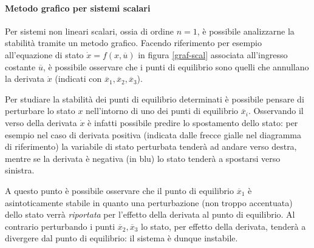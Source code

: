 		\paragraph{Metodo grafico per sistemi scalari} Per sistemi non lineari scalari, ossia di ordine $n=1$, è possibile analizzarne la stabilità tramite un metodo grafico. Facendo riferimento per esempio all'equazione di stato $\dot x = f(x,\overline u)$ in figura \ref{graf-scal} associata all'ingresso costante $\overline u$, è possibile osservare che i punti di equilibrio sono quelli che annullano la derivata $\dot x$ (indicati con $\overline x_1,\overline x_2,\overline x_3$).		
			
		
		Per studiare la stabilità dei punti di equilibrio determinati è possibile pensare di perturbare lo stato $x$ nell'intorno di uno dei punti di equilibrio $\overline x_i$. Osservando il verso della derivata $\dot x$ è infatti possibile predire lo spostamento dello stato: per esempio nel caso di derivata positiva (indicata dalle frecce gialle nel diagramma di riferimento) la variabile di stato perturbata tenderà ad andare verso destra, mentre se la derivata è negativa (in blu) lo stato tenderà a spostarsi verso sinistra.
		
		A questo punto è possibile osservare che il punto di equilibrio $\overline x_1$ è asintoticamente stabile in quanto una perturbazione (non troppo accentuata) dello stato verrà \textit{riportata} per l'effetto della derivata al punto di equilibrio. Al contrario perturbando i punti $\overline x_2,\overline x_3$ lo stato, per effetto della derivata, tenderà a divergere dal punto di equilibrio: il sistema è dunque instabile.
		

